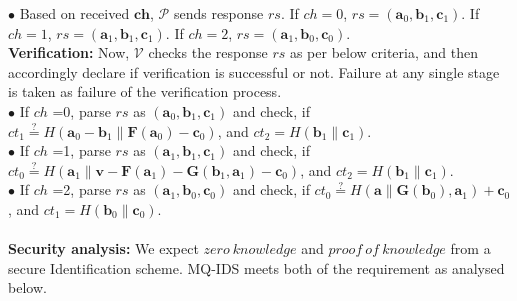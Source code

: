 \documentclass{article}
\begin{document}
$\bullet$ Based on received $\textbf{ch}$, $\mathcal{P}$ sends response $rs$. If $ch =0$, $rs=(\textbf{a}_0,\textbf{b}_1,\textbf{c}_1)$.
If $ch =1$, $rs=(\textbf{a}_1,\textbf{b}_1,\textbf{c}_1)$. If $ch =2$, $rs=(\textbf{a}_1,\textbf{b}_0,\textbf{c}_0)$.\\
\textbf{Verification:} Now, $\mathcal{V}$ checks the response $rs$ as per below criteria, and then accordingly declare if verification is successful or not. Failure at any single stage is taken as failure of the verification process.\\
$\bullet$ If $ch$ =0, parse $rs$ as $(\textbf{a}_0,\textbf{b}_1,\textbf{c}_1)$ and check, if $ct_1 \stackrel{?}{=} H(\textbf{a}_0 - \textbf{b}_1 \parallel \textbf{F}(\textbf{a}_0) -\textbf{c}_0)$, and $ct_2 = H(\textbf{b}_1 \parallel \textbf{c}_1)$.\\
$\bullet$ If $ch$ =1, parse $rs$ as $(\textbf{a}_1,\textbf{b}_1,\textbf{c}_1)$ and check, if $ct_0 \stackrel{?}{=} H(\textbf{a}_1 \parallel \textbf{v}- \textbf{F}(\textbf{a}_1) - \textbf{G}(\textbf{b}_1, \textbf{a}_1) -\textbf{c}_0)$, and $ct_2 = H(\textbf{b}_1 \parallel \textbf{c}_1)$.\\
$\bullet$ If $ch$ =2, parse $rs$ as $(\textbf{a}_1,\textbf{b}_0,\textbf{c}_0)$ and check, if $ct_0 \stackrel{?}{=} H(\textbf{a}\parallel \textbf{G}(\textbf{b}_0), \textbf{a}_1) + \textbf{c}_0$, and $ct_1 = H(\textbf{b}_0 \parallel \textbf{c}_0)$.\\
\\
\textbf{Security analysis:} We expect $zero\ knowledge$ and $proof\ of\ knowledge$ from a secure Identification scheme. MQ-IDS meets both of the requirement as analysed below.\\
\end{document}
